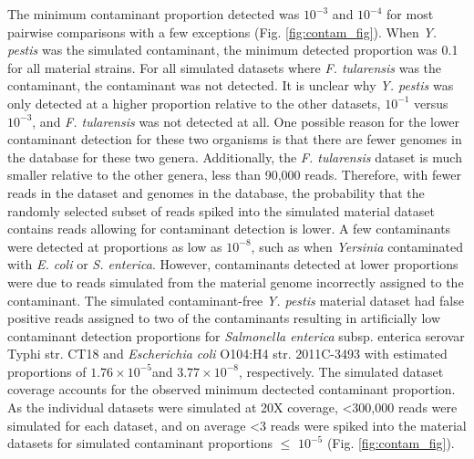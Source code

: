 \documentclass[fleqn,10pt,lineno]{wlpeerj}\usepackage[]{graphicx}\usepackage[]{color}
\begin{document}
The minimum contaminant proportion detected was $10^{-3}$ and  $10^{-4}$ for most pairwise comparisons with a few exceptions (Fig. \ref{fig:contam_fig}).
When \textit{Y. pestis} was the simulated contaminant, the minimum detected proportion was 0.1 for all material strains.
For all simulated datasets where \textit{F. tularensis} was the contaminant, the contaminant was not detected. 
It is unclear why \textit{Y. pestis} was only detected at a higher proportion relative to the other datasets, $10^{-1}$ versus $10^{-3}$, and \textit{F. tularensis} was not detected at all.
One possible reason for the lower contaminant detection for these two organisms is that there are fewer genomes in the database for these two genera.
Additionally, the \textit{F. tularensis} dataset is much smaller relative to the other genera, less than 90,000 reads.
Therefore, with fewer reads in the dataset and genomes in the database, the probability that the randomly selected subset of reads spiked into the simulated material dataset contains reads allowing for contaminant detection is lower. 
A few contaminants were detected at proportions as low as $10^{-8}$, such as when \textit{Yersinia} contaminated with \textit{E. coli} or \textit{S. enterica}.
However, contaminants detected at lower proportions were due to reads simulated from the material genome incorrectly assigned to the contaminant.
The simulated contaminant-free \textit{Y. pestis} material dataset had false positive reads assigned to two of the contaminants resulting in artificially low contaminant detection proportions for \textit{Salmonella enterica} subsp. {enterica} serovar Typhi str. CT18 and \textit{Escherichia coli} O104:H4 str. 2011C-3493 with estimated proportions of \ensuremath{1.76\times 10^{-5}}and \ensuremath{3.77\times 10^{-8}}, respectively. 
The simulated dataset coverage accounts for the observed minimum dectected contaminant proportion.
As the individual datasets were simulated at 20X coverage, \textless 300,000 reads were simulated for each dataset, and on average \textless 3 reads were spiked into the material datasets for simulated contaminant proportions $\leq$ $10^{-5}$ (Fig. \ref{fig:contam_fig}).
\end{document}
